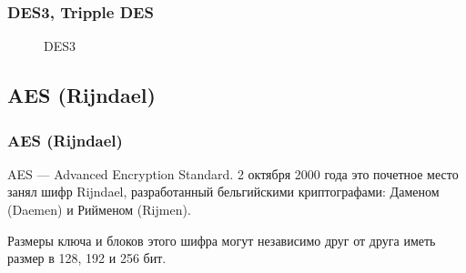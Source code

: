 \begin{frame}
    \frametitle{DES3, Tripple DES}

    \begin{figure}
        \begin{center}
        \end{center}
        \caption{DES3}\label{pict:des3}
    \end{figure}
\end{frame}


\subsection{AES (Rijndael)}


\begin{frame}
    \frametitle{AES (Rijndael)}
    
    AES --- Advanced Encryption Standard. 2 октября 2000 года это почетное место занял шифр Rijndael, разработанный бельгийскими криптографами: Даменом (Daemen) и Рийменом (Rijmen).
    
    Размеры ключа и блоков этого шифра могут независимо друг от друга иметь размер в 128, 192 и 256 бит.
\end{frame}


